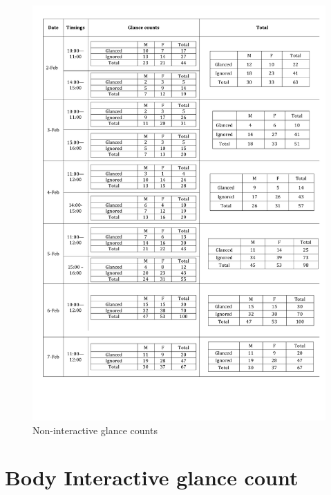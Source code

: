 \begin{appendices}
\begin{figure}[H]
 \centering 
    \includegraphics[width=\textwidth,height=0.8\textheight]{Appendices/8/non-interactive/non-interactive_glances.pdf}
    \caption{Non-interactive glance counts}
     \label{app:non-interactive-glancecount}%
\end{figure}


\section{Body Interactive glance count}


\end{appendices}
